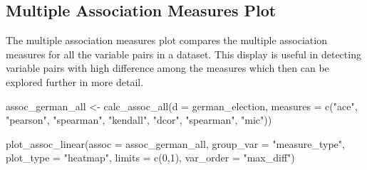 \hypertarget{multiple-association-measures-plot}{%
\subsection{Multiple Association Measures
Plot}\label{multiple-association-measures-plot}}

The multiple association measures plot compares the multiple association
measures for all the variable pairs in a dataset. This display is useful
in detecting variable pairs with high difference among the measures
which then can be explored further in more detail.

\begin{Schunk}
\begin{Sinput}
assoc_german_all <- calc_assoc_all(d = german_election,
                                   measures = c("ace",
                                                "pearson",
                                                "spearman",
                                                "kendall",
                                                "dcor",
                                                "spearman",
                                                "mic"))

plot_assoc_linear(assoc = assoc_german_all,
                  group_var = "measure_type", 
                  plot_type = "heatmap",
                  limits = c(0,1),
                  var_order = "max_diff")
\end{Sinput}
\begin{figure}


\end{figure}
\end{Schunk}

